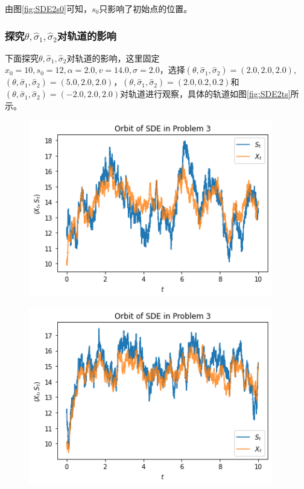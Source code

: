 \documentclass{article}
\begin{document}
由图\ref{fig:SDE2s0}可知，$s_0$只影响了初始点的位置。

\subsubsection{探究$\theta, \hat{\sigma}_1, \hat{\sigma}_2$对轨道的影响}

下面探究$\theta, \hat{\sigma}_1, \hat{\sigma}_2$对轨道的影响，这里固定$x_0 = 10, s_0 = 12, \alpha = 2.0, v = 14.0, \sigma = 2.0$，选择$(\theta, \hat{\sigma}_1, \hat{\sigma}_2) = (2.0, 2.0, 2.0)$, $(\theta, \hat{\sigma}_1, \hat{\sigma}_2) = (5.0, 2.0, 2.0)$，$(\theta, \hat{\sigma}_1, \hat{\sigma}_2) = (2.0, 0.2, 0.2)$和$(\theta, \hat{\sigma}_1, \hat{\sigma}_2) = (-2.0,2.0, 2.0)$对轨道进行观察，具体的轨道如图\ref{fig:SDE2ts}所示。 

\begin{figure}[H]
    \centering
    \begin{minipage}[c]{0.45\textwidth}
        \centering
        \includegraphics[width=0.95\textwidth]{figures/SDE2 Orbit1.png}
        \label{fig:SDE2ts-a}
    \end{minipage}
    \begin{minipage}[c]{0.45\textwidth}
        \centering
        \includegraphics[width=0.95\textwidth]{figures/SDE2 Orbit3.png}

\end{minipage}
\end{figure}
\end{document}
